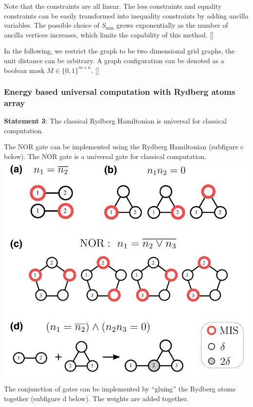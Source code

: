 \documentclass[twocolumn,superscriptaddress,english,showpacs,longbibliography]{revtex4-2}
\newcommand{\jinguo}[1]{[{\color{blue}{JGL: #1}}]}
\begin{document}
Note that the constraints are all linear. The less constraints and equality constraints can be easily transformed into inequality constraints by adding ancilla variables.
The possible choice of $S_{\text{min}}$ grows exponentially as the number of ancilla vertices increases, which limits the capability of this method.
\jinguo{We focus on the general graphs first.}

In the following, we restrict the graph to be two dimensional grid graphs, the unit distance can be arbitrary. A graph configuration can be denoted as a boolean mask $M\in \{0, 1\}^{m\times n}$.
\jinguo{Then the unit disk graphs.}

\subsubsection{Energy based universal computation with Rydberg atoms
array}\label{energy-based-universal-computation-with-rydberg-atoms-array}

\textbf{Statement 3}: The classical Rydberg Hamiltonian is universal for classical computation.

The NOR gate can be implemented using the Rydberg Hamiltonian (subfigure
c below). The NOR gate is a universal gate for classical computation.
\includegraphics[width=\columnwidth]{../notes/images/gadgets.png}

The conjunction of gates can be implemented by ``gluing'' the Rydberg
atoms together (subfigure d below). The weights are added together.
\end{document}
